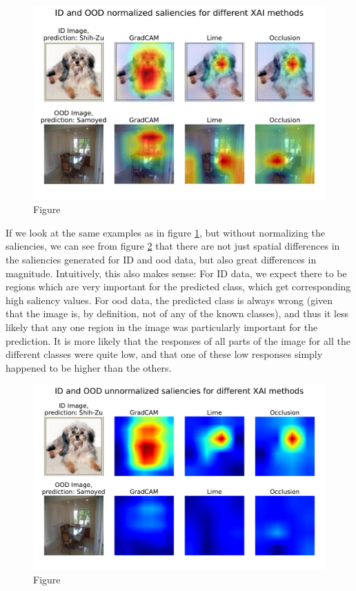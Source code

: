 \documentclass[UKenglish]{uiomasterthesis} %
\theoremstyle{definition}
\begin{document}
\begin{figure}[h]
\centerline{\includegraphics[width=5.25in]{figure/imagewoof_normalized_sal.pdf}}
\caption{Figure}
\label{fig:imagewoof_norm}
\end{figure}

If we look at the same examples as in figure \ref{fig:imagewoof_norm}, but without normalizing the saliencies, we can see from figure \ref{fig:imagewoof_unnorm} that there are not just spatial differences in the saliencies generated for ID and \ac{ood} data, but also great differences in magnitude. Intuitively, this also makes sense: For ID data, we expect there to be regions which are very important for the predicted class, which get corresponding high saliency values. For \ac{ood} data, the predicted class is always wrong (given that the image is, by definition, not of any of the known classes), and thus it less likely that any one region in the image was particularly important for the prediction. It is more likely that the responses of all parts of the image for all the different classes were quite low, and that one of these low responses simply happened to be higher than the others.

\begin{figure}[ht]
\centerline{\includegraphics[width=6.25in]{figure/imagewoof_unnormalized_sal.pdf}}
\caption{Figure}
\label{fig:imagewoof_unnorm}
\end{figure}
\end{document}
